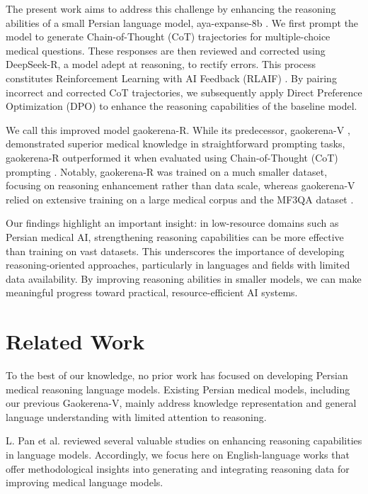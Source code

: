 \documentclass[conference]{IEEEtran}
\begin{document}
The present work aims to address this challenge by enhancing the reasoning abilities of a small Persian language model, aya-expanse-8b
\cite{b5}. We first prompt the model to generate Chain-of-Thought (CoT) trajectories for multiple-choice medical questions. These responses are then reviewed and corrected using DeepSeek-R, a model adept at reasoning, to rectify errors. This process constitutes Reinforcement Learning with AI Feedback (RLAIF)
\cite{b6}. By pairing incorrect and corrected CoT trajectories, we subsequently apply Direct Preference Optimization (DPO)
\cite{b7} to enhance the reasoning capabilities of the baseline model.

We call this improved model gaokerena-R. While its predecessor, gaokerena-V
\cite{b8}, demonstrated superior medical knowledge in straightforward prompting tasks, gaokerena-R outperformed it when evaluated using Chain-of-Thought (CoT) prompting
\cite{b9}. Notably, gaokerena-R was trained on a much smaller dataset, focusing on reasoning enhancement rather than data scale, whereas gaokerena-V relied on extensive training on a large medical corpus and the MF3QA dataset
\cite{b8}.

Our findings highlight an important insight: in low-resource domains such as Persian medical AI, strengthening reasoning capabilities can be more effective than training on vast datasets. This underscores the importance of developing reasoning-oriented approaches, particularly in languages and fields with limited data availability. By improving reasoning abilities in smaller models, we can make meaningful progress toward practical, resource-efficient AI systems.
	
	\section{Related Work}
To the best of our knowledge, no prior work has focused on developing Persian medical reasoning language models. Existing Persian medical models, including our previous Gaokerena-V, mainly address knowledge representation and general language understanding with limited attention to reasoning.

 L. Pan et al. reviewed several valuable studies on enhancing reasoning capabilities in language models.
\cite{b10}
Accordingly, we focus here on English-language works that offer methodological insights into generating and integrating reasoning data for improving medical language models.
\end{document}
